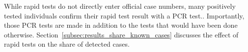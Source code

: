 While rapid tests do not directly enter official case numbers, many positively tested
individuals confirm their rapid test result with a PCR test.. Importantly,
those PCR tests are made in addition to the tests that would have been done otherwise.
Section~\ref{subsec:results_share_known_cases} discusses the effect of rapid tests on
the share of detected cases.